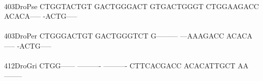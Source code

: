\documentclass[11pt,twoside,reqno,a4paper]{article}
\begin{document}
{\hspace*{4\charwidth}\hspace*{7\charwidth}\hspace*{1\charwidth}\hspace*{1\charwidth}\hspace*{1\charwidth}\hspace*{1\charwidth}\hspace*{1\charwidth}\hspace*{1\charwidth}\\
403\hspace*{1\charwidth}DroPse	CTGGTACTGT	GACTGGGACT	GTGACTGGGT	CTGGAAGACC	ACACA-----	-ACTG-----	\\
\hspace*{4\charwidth}\hspace*{7\charwidth}\hspace*{1\charwidth}\hspace*{1\charwidth}\hspace*{1\charwidth}\hspace*{1\charwidth}\hspace*{1\charwidth}\hspace*{1\charwidth}\\
403\hspace*{1\charwidth}DroPer	CTGGGACTGT	GACTGGGTCT	G---------	---AAAGACC	ACACA-----	-ACTG-----	\\
\hspace*{4\charwidth}\hspace*{7\charwidth}\hspace*{1\charwidth}\hspace*{1\charwidth}\hspace*{1\charwidth}\hspace*{1\charwidth}\hspace*{1\charwidth}\hspace*{1\charwidth}\\
412\hspace*{1\charwidth}DroGri	CTGG------	----------	----------	CTTCACGACC	ACACATTGCT	AA--------	\\
\hspace*{4\charwidth}\hspace*{7\charwidth}\hspace*{1\charwidth}\hspace*{1\charwidth}\hspace*{1\charwidth}\hspace*{1\charwidth}\hspace*{1\charwidth}\hspace*{1\charwidth}\\
}
\end{document}
